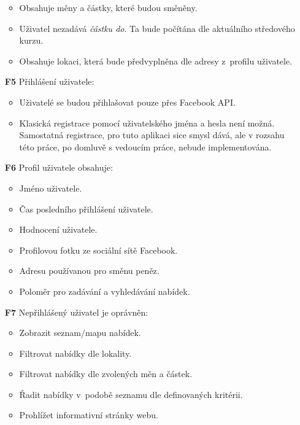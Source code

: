 \begin{itemize}
        \begin{itemize}
            \item Obsahuje měny a částky, které budou směněny.
            \item Uživatel nezadává \textit{částku do}. Ta bude počítána dle aktuálního středového kurzu.
            \item Obsahuje lokaci, která bude předvyplněna dle adresy z~profilu uživatele.
        \end{itemize}
    \item[\textbf{F5}] Přihlášení uživatele:
        \begin{itemize}
            \item Uživatelé se budou přihlašovat pouze přes Facebook API.
            \item Klasická registrace pomocí uživatelského jména a hesla není možná. Samostatná registrace, pro tuto aplikaci sice smysl dává, ale v rozsahu této práce, po domluvě s vedoucím práce, nebude implementována.
        \end{itemize}
    \item[\textbf{F6}] Profil uživatele obsahuje:
        \begin{itemize}
            \item Jméno uživatele.
            \item Čas posledního přihlášení uživatele.
            \item Hodnocení uživatele.
            \item Profilovou fotku ze sociální sítě Facebook.
            \item Adresu používanou pro směnu peněz.
            \item Poloměr pro zadávání a vyhledávání nabídek.
        \end{itemize}
    \item[\textbf{F7}] Nepřihlášený uživatel je oprávněn:
        \begin{itemize}
            \item Zobrazit seznam/mapu nabídek.
            \item Filtrovat nabídky dle lokality.
            \item Filtrovat nabídky dle zvolených měn a částek.
            \item Řadit nabídky v~podobě seznamu dle definovaných kritérii.
            \item Prohlížet informativní stránky webu.
        \end{itemize}
\end{itemize}


